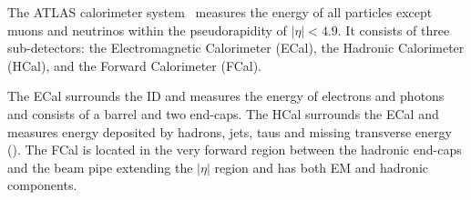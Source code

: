 







The ATLAS calorimeter system~\cite{atlas_calorimeter_tdr} measures the energy of all particles except muons and neutrinos within the pseudorapidity of $|\eta| < 4.9$\@. It consists of three sub-detectors: the Electromagnetic Calorimeter (ECal), the Hadronic Calorimeter (HCal), and the Forward Calorimeter (FCal). 

The ECal surrounds the ID and measures the energy of electrons and photons and consists of a barrel and two end-caps. The HCal surrounds the ECal and measures energy deposited by hadrons, jets, taus and missing transverse energy (\met). The FCal is located in the very forward region between the hadronic end-caps and the beam pipe extending the $|\eta|$ region and has both EM and hadronic components. 

